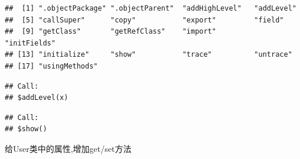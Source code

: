 \documentclass[]{book}
\newenvironment{Shaded}{\begin{snugshade}}{\end{snugshade}}
\newcommand{\KeywordTok}[1]{\textcolor[rgb]{0.13,0.29,0.53}{\textbf{#1}}}
\newcommand{\StringTok}[1]{\textcolor[rgb]{0.31,0.60,0.02}{#1}}
\newcommand{\CommentTok}[1]{\textcolor[rgb]{0.56,0.35,0.01}{\textit{#1}}}
\newcommand{\OperatorTok}[1]{\textcolor[rgb]{0.81,0.36,0.00}{\textbf{#1}}}
\newcommand{\NormalTok}[1]{#1}
\begin{document}
\begin{Shaded}
\end{Shaded}

\begin{verbatim}
##  [1] ".objectPackage" ".objectParent"  "addHighLevel"   "addLevel"      
##  [5] "callSuper"      "copy"           "export"         "field"         
##  [9] "getClass"       "getRefClass"    "import"         "initFields"    
## [13] "initialize"     "show"           "trace"          "untrace"       
## [17] "usingMethods"
\end{verbatim}

\begin{Shaded}
\end{Shaded}

\begin{verbatim}
## Call:
## $addLevel(x)
\end{verbatim}

\begin{Shaded}
\end{Shaded}

\begin{verbatim}
## Call:
## $show()
\end{verbatim}

给User类中的属性,增加get/set方法

\begin{Shaded}
\end{Shaded}
\end{document}
